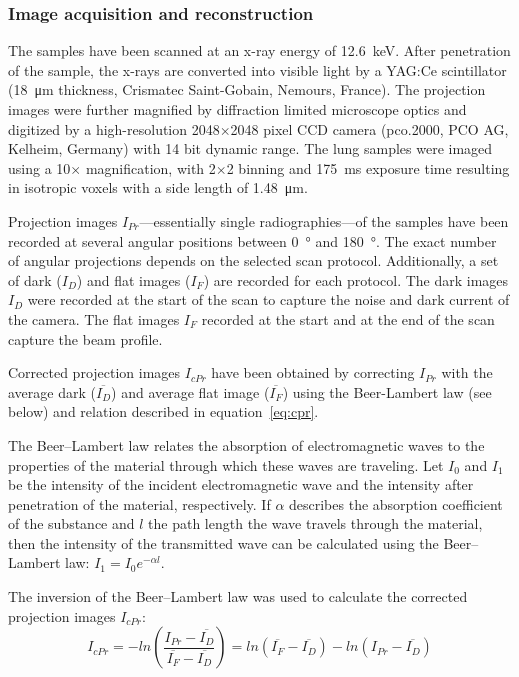 \subsubsection{Image acquisition and reconstruction}%
\label{seq:Image Acquisition}%
The samples have been scanned at an x-ray energy of \SI{12.6}{\kilo\electronvolt}. After penetration of the sample, the x-rays are converted into visible light by a YAG:Ce scintillator (\SI{18}{\micro\meter} thickness, Crismatec Saint-Gobain, Nemours, France). The projection images were further magnified by diffraction limited microscope optics and digitized by a high-resolution 2048$\times$2048 pixel CCD camera (pco.2000, PCO AG, Kelheim, Germany) with 14 bit dynamic range. The lung samples were imaged using a 10$\times$ magnification, with 2$\times$2 binning and \SI{175}{\milli\second} exposure time resulting in isotropic voxels with a side length of \SI{1.48}{\micro\meter}.

Projection images $I_{Pr}$---essentially single radiographies---of the samples have been recorded at several angular positions between \SI{0}{\degree} and \SI{180}{\degree}. The exact number of angular projections depends on the selected scan protocol. Additionally, a set of dark ($I_{D}$) and flat images ($I_{F}$) are recorded for each protocol. The dark images $I_{D}$ were recorded at the start of the scan to capture the noise and dark current of the camera. The flat images $I_{F}$ recorded at the start and at the end of the scan capture the beam profile.

Corrected projection images $I_{cPr}$ have been obtained by correcting $I_{Pr}$ with the average dark ($\overline{I_{D}}$) and average flat image ($\overline{I_{F}}$) using the Beer-Lambert law (see below) and relation described in equation~\ref{eq:cpr}.

The Beer--Lambert law relates the absorption of electromagnetic waves to the properties of the material through which these waves are traveling. Let $I_{0}$ and $I_{1}$ be the intensity of the incident electromagnetic wave and the intensity after penetration of the material, respectively. If $\alpha$ describes the absorption coefficient of the substance and $l$ the path length the wave travels through the material, then the intensity of the transmitted wave can be calculated using the Beer--Lambert law: \(I_{1}=I_{0}e^{-\alpha l}\label{eq:beer-lambert}\).

The inversion of the Beer--Lambert law was used to calculate the corrected projection images $I_{cPr}$:
\begin{equation}
	I_{cPr} = -ln\left(\frac{I_{Pr}-\overline{I_{D}}}{\overline{I_{F}}-\overline{I_{D}}}\right)
	= ln(\overline{I_{F}}-\overline{I_{D}})-ln(I_{Pr}-\overline{I_{D}})
	\label{eq:cpr}
\end{equation}

